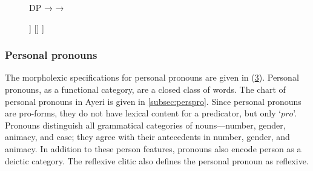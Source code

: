 \begin{figure}[h]
\pex\label{ex:dpstruct}
\a DP →  
\a {} →  
\xe
\end{figure}

\begin{figure}[h]
\ex\label{ex:dpcstruct}
\begin{forest}
[{\anno[\pass{\DF} $\vee$ \pass{\GF}]{DP}}
	[\anno{\xbar{D}}
		[{\anno{YP}}]
		[\anno{\xhead{D}}]
	]
	[{}]
]
\end{forest}
\xe
\end{figure}

\subsubsection{Personal pronouns}
\label{subsubsec:perspro}

The morpholexic specifications for personal pronouns are given in
(\ref{ex:perspromorphlex}). Personal pronouns, as a functional category, are a
closed class of words. The chart of personal pronouns in Ayeri is given in
\autoref{subsec:perspro}. Since personal pronouns are pro-forms, they do not
have lexical content for a predicator, but only `$pro$'. Pronouns distinguish
all grammatical categories of nouns---number, gender, animacy, and case; they
agree with their antecedents in number, gender, and animacy. In addition to
these person features, pronouns also encode person as a deictic category. The
reflexive clitic  also defines the personal pronoun as
reflexive.

\begin{figure}[h]
\begin{morphlex}
\ex\label{ex:perspromorphlex}
\xe
\end{morphlex}
\end{figure}

